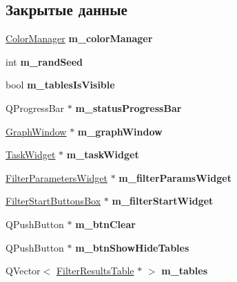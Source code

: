 \subsection*{Закрытые данные}
\begin{DoxyCompactItemize}
\item 
\hypertarget{class_main_window_a6c0331486f528b76b569fc02baf1037e}{}\label{class_main_window_a6c0331486f528b76b569fc02baf1037e} 
\hyperlink{class_color_manager}{Color\+Manager} {\bfseries m\+\_\+color\+Manager}
\item 
\hypertarget{class_main_window_a35d09b312795b853ef4b75508c0c371d}{}\label{class_main_window_a35d09b312795b853ef4b75508c0c371d} 
int {\bfseries m\+\_\+rand\+Seed}
\item 
\hypertarget{class_main_window_a6ea719792b7699a0d5e81181ba6f5b2c}{}\label{class_main_window_a6ea719792b7699a0d5e81181ba6f5b2c} 
bool {\bfseries m\+\_\+tables\+Is\+Visible}
\item 
\hypertarget{class_main_window_a17685071143ec93292f9e6909ab78901}{}\label{class_main_window_a17685071143ec93292f9e6909ab78901} 
Q\+Progress\+Bar $\ast$ {\bfseries m\+\_\+status\+Progress\+Bar}
\item 
\hypertarget{class_main_window_a7f1ee1494ff008c4a7f6d395ecaac87e}{}\label{class_main_window_a7f1ee1494ff008c4a7f6d395ecaac87e} 
\hyperlink{class_graph_window}{Graph\+Window} $\ast$ {\bfseries m\+\_\+graph\+Window}
\item 
\hypertarget{class_main_window_acc365673b948684fd72adbf4924c0c97}{}\label{class_main_window_acc365673b948684fd72adbf4924c0c97} 
\hyperlink{class_task_widget}{Task\+Widget} $\ast$ {\bfseries m\+\_\+task\+Widget}
\item 
\hypertarget{class_main_window_a463e4f6880ba393e7b8d3de20e7fc96a}{}\label{class_main_window_a463e4f6880ba393e7b8d3de20e7fc96a} 
\hyperlink{class_filter_parameters_widget}{Filter\+Parameters\+Widget} $\ast$ {\bfseries m\+\_\+filter\+Params\+Widget}
\item 
\hypertarget{class_main_window_a88d26017f0ec68df1ec9a8d9cd53fd8a}{}\label{class_main_window_a88d26017f0ec68df1ec9a8d9cd53fd8a} 
\hyperlink{class_filter_start_buttons_box}{Filter\+Start\+Buttons\+Box} $\ast$ {\bfseries m\+\_\+filter\+Start\+Widget}
\item 
\hypertarget{class_main_window_a00b995ad2a53bd276a53fc137048b278}{}\label{class_main_window_a00b995ad2a53bd276a53fc137048b278} 
Q\+Push\+Button $\ast$ {\bfseries m\+\_\+btn\+Clear}
\item 
\hypertarget{class_main_window_a3fd0f094bf729b91405b14deb7ae4c54}{}\label{class_main_window_a3fd0f094bf729b91405b14deb7ae4c54} 
Q\+Push\+Button $\ast$ {\bfseries m\+\_\+btn\+Show\+Hide\+Tables}
\item 
\hypertarget{class_main_window_aab37e47932ec4fc5002724bdef5f959b}{}\label{class_main_window_aab37e47932ec4fc5002724bdef5f959b} 
Q\+Vector$<$ \hyperlink{class_filter_results_table}{Filter\+Results\+Table} $\ast$ $>$ {\bfseries m\+\_\+tables}
\end{DoxyCompactItemize}


